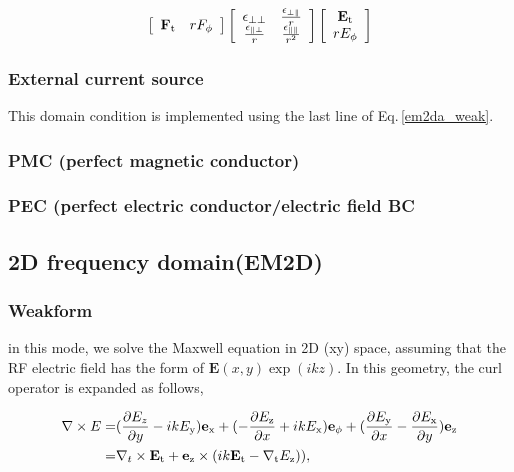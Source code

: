 \documentclass[11pt,a4paper,final]{report}
\begin{document}
 \begin{equation}
 \left[ {\begin{array}{*{20}c}
\mathbf{F}_{\rm t}  & rF_{\rm \phi}\\
\end{array}}\right]
\left[ {\begin{array}{*{20}c}
\mathbf{\epsilon}_{\perp \perp}  & \frac{\mathbf{\epsilon}_{\perp \parallel}}{r}\\
\frac{\mathbf{\epsilon}_{\parallel \perp}}{r} & \frac{\mathbf{\epsilon}_{\parallel \parallel}}{r^2}\\
\end{array}}\right]
 \left[ {\begin{array}{*{20}c}
\mathbf{E}_{\rm t}  \\
rE_{\rm \phi}\\
\end{array}}\right]
\label{em2da_anisotropic}
\end{equation}

 \subsubsection{External current source}
 This domain condition is implemented using the last line of Eq.\,\ref{em2da_weak}. 
 
 \subsubsection{PMC (perfect magnetic conductor)}
 
 \subsubsection{PEC (perfect electric conductor/electric field BC}
  
\subsection{2D frequency domain(EM2D)}
\subsubsection{Weakform}
in this mode, we solve the Maxwell equation in 2D (xy) space, assuming that the RF electric field has the form of $\mathbf{E}(x, y) \exp{(ikz)}$. 
In this geometry, the curl operator is expanded as follows,

 \begin{align}
 \nabla \times E = &(\frac{\partial E_{z}}{\partial y}- ik E_{\rm y} )\mathbf{e}_{\rm x} +
( -\frac{\partial E_{\rm z}}{\partial x} + ik E_{\rm x})\mathbf{e}_{\rm \phi}+
( \frac{\partial E_{\rm y}}{\partial x} - \frac{\partial E_{\rm x}}{\partial y})\mathbf{e}_{\rm z} 
 \notag \\ 
 = &\nabla_{t} \times \mathbf{E}_{\rm t} + \mathbf{e}_{\rm z} \times (ik \mathbf{E}_{\rm t} - \nabla_{\rm t} E_{\rm z}) ),
 \end{align}
\end{document}
